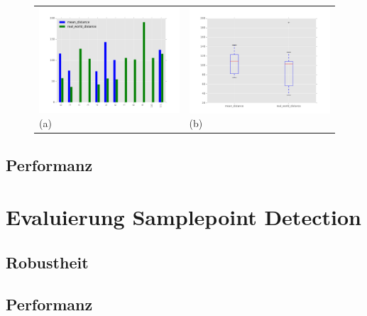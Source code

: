 	\begin{figure}[h]
		\centering
		\begin{tabular}{m{7.0cm} m{7.0cm}}
		\includegraphics[width=7cm]{img/evaluation/tiny_bar}
		\centering \small (a)
		&
		\includegraphics[width=7cm]{img/evaluation/tiny_box}
		\centering \small (b)
		\end{tabular}
	    \caption{}
	    \label{fig:eval_tiny}
	\end{figure}

    \subsection{Performanz}
    \label{subsec:subimage_performanz}

\section{Evaluierung Samplepoint Detection}
\label{sec:evaluierung_samplepoint}

    \subsection{Robustheit}
    \label{subsec:samplepoint_robustheit}    

    \subsection{Performanz}
    \label{subsec:samplepoint_performanz}